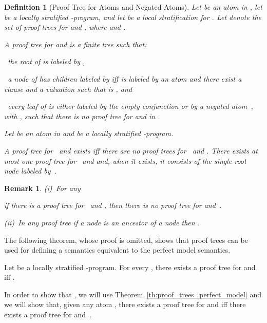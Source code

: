 \documentclass[english]{tlp}
\newtheorem{definition}{Definition} \newtheorem{example}{Example}       \newtheorem{remark}{Remark}
\begin{document}
\begin{definition}[Proof Tree for Atoms and Negated Atoms]
\label{def:proof_tree}  Let  be an atom in
, let  be a locally stratified
-program, and let  be a local stratification for
. Let  denote the set of proof trees for  and
, where  and . 

\noindent
A \emph{proof tree} for  and  is a finite tree
 such that\/{\rm :} 

\hangindent=8mm\noindent
{}~the root of  is labeled by ,

\noindent
{}~a node  of  has children labeled by   iff  is labeled by an atom
 and there exist a clause  and a valuation  such that  is , and 

\noindent
{}~every leaf
of  is either labeled by the empty conjunction  or by a negated atom~, with
, such that there is no proof tree for
 and  in .

\hangindent=0mm\smallskip
\noindent Let  be an atom in 
and  be a locally stratified
-program. 

\noindent A \emph{proof tree} for~ and  exists iff there are no proof
trees for~ and . There exists at most one proof tree 
for~ and  and, when it exists, it consists of the single root node labeled by~.

\end{definition}

\vspace{-3mm} 
\noindent
\begin{remark}\label{rem:proof-tree} 
{\rm(i)}~For any 
 
if  there is a proof tree for~ and , then
there is no proof tree for  and~.

\noindent
{\rm(ii)}~In any proof tree if a node  is an ancestor of a 
node  then
.
\end{remark}

The following theorem, whose proof is omitted, shows that proof trees
can be used for defining a semantics equivalent to the perfect model
semantics.

\begin{theorem} \label{th:proof_trees_perfect_model}  Let  be a
locally stratified -program. For every , there exists a proof tree for 
and  iff .
\end{theorem}

In order to show that , we will use
Theorem~\ref{th:proof_trees_perfect_model} and we will show that,
given any atom , there exists a proof
tree for  and  iff there exists a proof tree for
 and~. 
\end{document}
